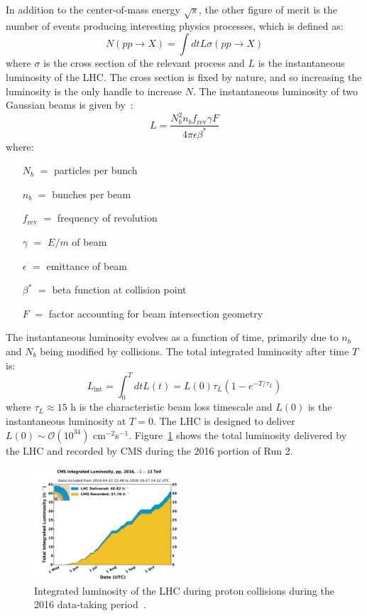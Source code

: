 In addition to the center-of-mass energy $\sqrt{s}$, the other figure of merit is the number of events producing interesting physics processes, which is defined as:
\begin{equation} 
    N(pp\rightarrow X) = \int dt L \sigma(pp\rightarrow X)
\end{equation}
where $\sigma$ is the cross section of the relevant process and $L$ is the instantaneous luminosity of the LHC. 
The cross section is fixed by nature, and so increasing the luminosity is the only handle to increase $N$. 
The instantaneous luminosity of two Gaussian beams is given by~\cite{lhcjinst}:
\begin{equation}
    L = \frac{N_b^2 n_b f_\mathrm{rev} \gamma F}{4\pi\epsilon \beta^*}
\end{equation}
where:
\begin{itemize}
    \item[$N_b$ $=$] particles per bunch
    \item[$n_b$ $=$] bunches per beam 
    \item[$f_\mathrm{rev}$ $=$] frequency of revolution 
    \item[$\gamma$ $=$] $E/m$ of beam 
    \item[$\epsilon$ $=$] emittance of beam 
    \item[$\beta^*$ $=$] beta function at collision point 
    \item[$F$ $=$] factor accounting for beam intersection geometry
\end{itemize}
The instantaneous luminosity evolves as a function of time, primarily due to $n_b$ and $N_b$ being modified by collisions.
The total integrated luminosity after time $T$ is:
\begin{equation}
    L_\mathrm{int} = \int_0^T dt L(t) = L(0) \tau_L \left(1 - e^{-T/\tau_L}\right)
\end{equation}
where $\tau_L \approx 15$ h is the characteristic beam loss timescale and $L(0)$ is the instantaneous luminosity at $T=0$.
The LHC is designed to deliver $L(0) \sim \mathcal{O}(10^{34})$ cm$^{-2}$s$^{-1}$. 
Figure~\ref{fig:cms:lumi} shows the total luminosity delivered by the LHC and recorded by CMS during the 2016 portion of Run 2. 

\begin{figure}[][]
    \begin{center}
        \includegraphics[width=0.5\textwidth]{figures/cms/lumi.pdf}
        \caption{Integrated luminosity of the LHC during proton collisions during the 2016 data-taking period~\cite{lumitwiki}.}
        \label{fig:cms:lumi}
    \end{center}
\end{figure}


